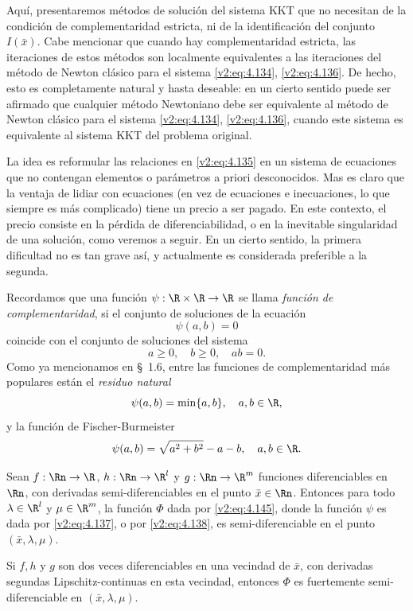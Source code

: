 Aquí, presentaremos métodos de solución del sistema KKT que no necesitan de la condición de complementaridad estricta, ni de la identificación del conjunto $I(\bar{x})$. Cabe mencionar que cuando hay complementaridad estricta, las iteraciones de estos métodos son localmente equivalentes a las iteraciones del método de Newton clásico para el sistema \eqref{v2:eq:4.134}, \eqref{v2:eq:4.136}. De hecho, esto es completamente natural y hasta deseable: en un cierto sentido puede ser afirmado que cualquier método Newtoniano debe ser equivalente al método de Newton clásico para el sistema \eqref{v2:eq:4.134}, \eqref{v2:eq:4.136}, cuando este sistema es equivalente al sistema KKT del problema original.

La idea es reformular las relaciones en \eqref{v2:eq:4.135} en un sistema de ecuaciones que no contengan elementos o parámetros a priori desconocidos. Mas es claro que la ventaja de lidiar con ecuaciones (en vez de ecuaciones e inecuaciones, lo que siempre es más complicado) tiene un precio a ser pagado. En este contexto, el precio consiste en la pérdida de diferenciabilidad, o en la inevitable singularidad de una solución, como veremos a seguir. En un cierto sentido, la primera dificultad no es tan grave así, y actualmente es considerada preferible a la segunda.

Recordamos que una función $\psi : \R \times \R \to \R$ se llama \textit{función de complementaridad}, si el conjunto de soluciones de la ecuación
\[
    \psi(a, b) = 0
\]
coincide con el conjunto de soluciones del sistema
\[
    a \ge 0, \quad b \ge 0, \quad ab = 0.
\]
Como ya mencionamos en \S~1.6, entre las funciones de complementaridad más populares están el \textit{residuo natural}
\begin{equation}
    \psi(a, b) = \min\{a, b\}, \quad a, b \in \R,
    \label{v2:eq:4.137}
\end{equation}
y la función de Fischer-Burmeister
\begin{equation}
    \psi(a, b) = \sqrt{a^2 + b^2} - a - b, \quad a, b \in \R.
    \label{v2:eq:4.138}
\end{equation}

\begin{proposition}\label{v2:prop:4.5.1}
    Sean $f : \Rn \to \R$, $h : \Rn \to \R^l$ y $g : \Rn \to \R^m$ funciones diferenciables en $\Rn$, con derivadas semi-diferenciables en el punto $\bar{x} \in \Rn$.
    Entonces para todo $\lambda \in \R^l$ y $\mu \in \R^m$, la función $\Phi$ dada por \eqref{v2:eq:4.145}, donde la función $\psi$ es dada por \eqref{v2:eq:4.137}, o por \eqref{v2:eq:4.138}, es semi-diferenciable en el punto $(\bar{x}, \lambda, \mu)$.
    
    Si $f, h$ y $g$ son dos veces diferenciables en una vecindad de $\bar{x}$, con derivadas segundas Lipschitz-continuas en esta vecindad, entonces $\Phi$ es fuertemente semi-diferenciable en $(\bar{x}, \lambda, \mu)$.
\end{proposition}

